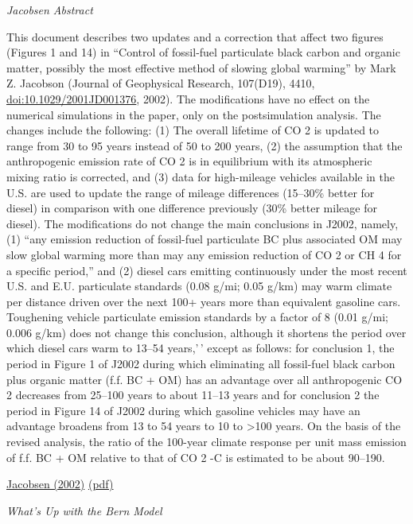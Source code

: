 \documentclass[
]{book}
\begin{document}
\emph{Jacobsen Abstract}

This document describes two updates and a correction that affect two figures
(Figures 1 and 14) in ``Control of fossil-fuel particulate black carbon and organic matter,
possibly the most effective method of slowing global warming'' by Mark Z. Jacobson
(Journal of Geophysical Research, 107(D19), 4410, \url{doi:10.1029/2001JD001376}, 2002).
The modifications have no effect on the numerical simulations in the paper, only on the
postsimulation analysis. The changes include the following: (1) The overall lifetime of
CO 2 is updated to range from 30 to 95 years instead of 50 to 200 years, (2) the
assumption that the anthropogenic emission rate of CO 2 is in equilibrium with its
atmospheric mixing ratio is corrected, and (3) data for high-mileage vehicles available in
the U.S. are used to update the range of mileage differences (15--30\% better for diesel) in
comparison with one difference previously (30\% better mileage for diesel). The
modifications do not change the main conclusions in J2002, namely, (1) ``any emission
reduction of fossil-fuel particulate BC plus associated OM may slow global warming more
than may any emission reduction of CO 2 or CH 4 for a specific period,'' and (2) diesel
cars emitting continuously under the most recent U.S. and E.U. particulate standards
(0.08 g/mi; 0.05 g/km) may warm climate per distance driven over the next 100+ years
more than equivalent gasoline cars. Toughening vehicle particulate emission standards by
a factor of 8 (0.01 g/mi; 0.006 g/km) does not change this conclusion, although it
shortens the period over which diesel cars warm to 13--54 years,'\,' except as follows: for
conclusion 1, the period in Figure 1 of J2002 during which eliminating all fossil-fuel
black carbon plus organic matter (f.f. BC + OM) has an advantage over all anthropogenic
CO 2 decreases from 25--100 years to about 11--13 years and for conclusion 2 the period in
Figure 14 of J2002 during which gasoline vehicles may have an advantage broadens
from 13 to 54 years to 10 to \textgreater100 years. On the basis of the revised analysis, the ratio of
the 100-year climate response per unit mass emission of f.f. BC + OM relative to that of
CO 2 -C is estimated to be about 90--190.

\href{http://www.stanford.edu/group/efmh/jacobson/Articles/VIII/fossil/ClimRespUpdJGR\%201.pdf}{Jacobsen (2002)}
\href{pdf/Jacobsen_2002_CO2_Lifetime.pdf}{(pdf)}

\emph{What's Up with the Bern Model}
\end{document}
